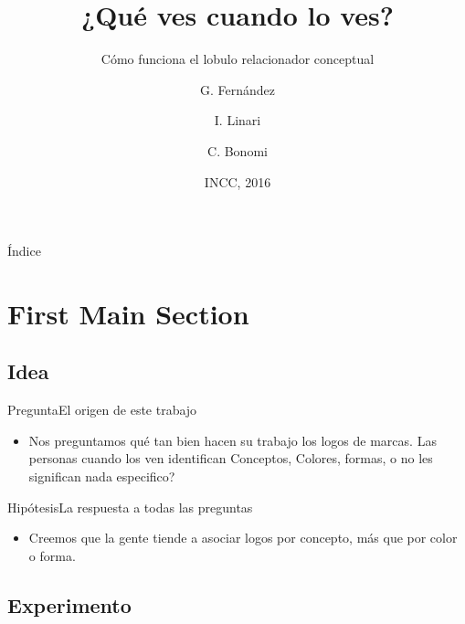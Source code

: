 \documentclass{beamer}
\title{¿Qué ves cuando lo ves?}
\subtitle{Cómo funciona el lobulo relacionador conceptual}
\author{G. Fernández \and I. Linari \and C. Bonomi}
\institute[UBA] %
{
  \inst{1}%
  Departmento de Computación\\
  Universidad de Buenos Aires
  \and
  \inst{2}%
  Department of Theoretical Philosophy\\
  University of Elsewhere}
\date{INCC, 2016}
\begin{document}
\begin{frame}
  \titlepage
\end{frame}

\begin{frame}{Índice}
  \tableofcontents
\end{frame}

\section{First Main Section}

\subsection{Idea}

\begin{frame}{Pregunta}{El origen de este trabajo}
  \begin{itemize}
  \item {

    Nos preguntamos qué tan bien hacen su trabajo los logos de marcas. Las personas cuando los ven identifican Conceptos, Colores, formas, o no les significan nada especifico? 

  }

 
  \end{itemize}
\end{frame}

\begin{frame}{Hipótesis}{La respuesta a todas las preguntas}
  \begin{itemize}
  \item {

    Creemos que la gente tiende a asociar logos por concepto, más que por color o forma.

  }

 
  \end{itemize}
\end{frame}

\subsection{Experimento}
\end{document}
